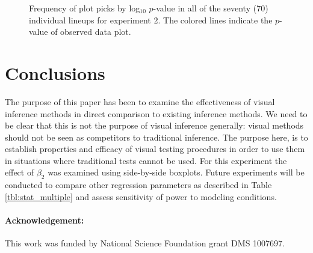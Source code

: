 \documentclass{article}
\begin{document}
\begin{figure}[hbtp]
   \centering
       \caption{Frequency of plot picks by log$_10$ $p$-value in all of the seventy (70) individual lineups for experiment 2. The colored lines indicate the $p$-value of observed data plot.}
       \label{fig:P-val_log2}
\end{figure}


\section{Conclusions}

The purpose of this paper has been to examine the effectiveness of visual inference methods in direct comparison to existing inference methods. We need to be clear that this is not the purpose of visual inference generally: visual methods should not be seen as competitors to traditional inference.  The purpose here, is to  establish properties and  efficacy of visual testing procedures in order to use them in situations where traditional tests cannot be used. For this experiment the effect of $\beta_2$ was examined using side-by-side boxplots. Future experiments will be conducted to compare other regression parameters as described in Table \ref{tbl:stat_multiple} and assess sensitivity of power to modeling conditions.

\paragraph{Acknowledgement:}

This work was funded by National Science Foundation grant DMS 1007697.
\end{document}
